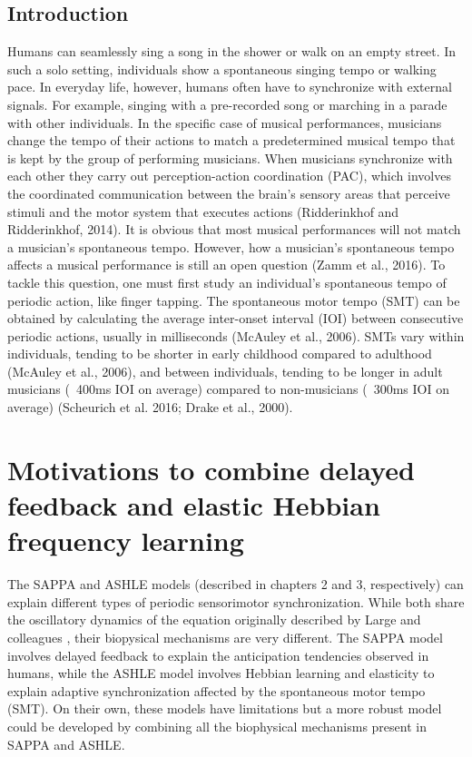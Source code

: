 \documentclass{report}
\begin{document}
\section{Introduction}
Humans can seamlessly sing a song in the shower or walk on an empty street. In such a solo setting, individuals show a spontaneous singing tempo or walking pace. In everyday life, however, humans often have to synchronize with external signals. For example, singing with a pre-recorded song or marching in a parade with other individuals. In the specific case of musical performances, musicians change the tempo of their actions to match a predetermined musical tempo that is kept by the group of performing musicians. When musicians synchronize with each other they carry out perception-action coordination (PAC), which involves the coordinated communication between the brain’s sensory areas that perceive stimuli and the motor system that executes actions (Ridderinkhof and Ridderinkhof, 2014). It is obvious that most musical performances will not match a musician's spontaneous tempo. However, how a musician's spontaneous tempo affects a musical performance is still an open question (Zamm et al., 2016). To tackle this question, one must first study an individual’s spontaneous tempo of periodic action, like finger tapping. The spontaneous motor tempo (SMT) can be obtained by calculating the average inter-onset interval (IOI) between consecutive periodic actions, usually in milliseconds (McAuley et al., 2006). SMTs vary within individuals, tending to be shorter in early childhood compared to adulthood (McAuley et al., 2006), and between individuals, tending to be longer in adult musicians (~400ms IOI on average) compared to non-musicians (~300ms IOI on average) (Scheurich et al. 2016; Drake et al., 2000).

\chapter{Motivations to combine delayed feedback and elastic Hebbian frequency learning}

The SAPPA and ASHLE models (described in chapters 2 and 3, respectively) can explain different types of periodic sensorimotor synchronization. While both share the oscillatory dynamics of the equation originally described by Large and colleagues \cite{large2010canonical}, their biopysical mechanisms are very different. The SAPPA model involves delayed feedback to explain the anticipation tendencies observed in humans, while the ASHLE model involves Hebbian learning and elasticity to explain adaptive synchronization affected by the spontaneous motor tempo (SMT). On their own, these models have limitations but a more robust model could be developed by combining all the biophysical mechanisms present in SAPPA and ASHLE.
\end{document}
